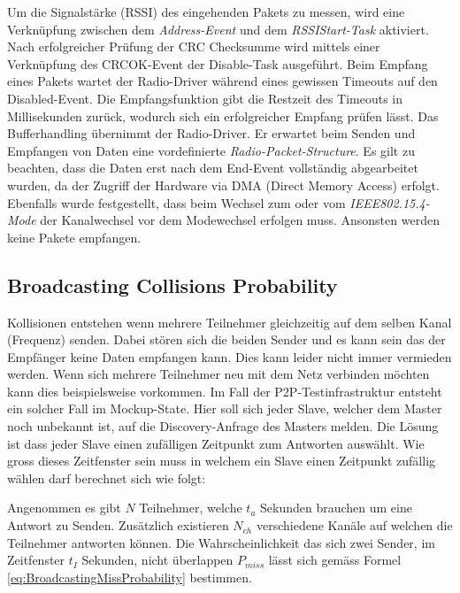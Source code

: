 Um die Signalstärke (RSSI) des eingehenden Pakets zu messen, wird eine Verknüpfung zwischen dem \textit{Address-Event} und dem \textit{RSSIStart-Task} aktiviert.
Nach erfolgreicher Prüfung der CRC Checksumme wird mittels einer Verknüpfung des CRCOK-Event der Disable-Task ausgeführt.
Beim Empfang eines Pakets wartet der Radio-Driver während eines gewissen Timeouts auf den Disabled-Event.
Die Empfangsfunktion gibt die Restzeit des Timeouts in Millisekunden zurück, wodurch sich ein erfolgreicher Empfang prüfen lässt.
Das Bufferhandling übernimmt der Radio-Driver. Er erwartet beim Senden und Empfangen von Daten eine vordefinierte \textit{Radio-Packet-Structure}.
Es gilt zu beachten, dass die Daten erst nach dem End-Event  vollständig abgearbeitet wurden, da der Zugriff der Hardware via DMA (Direct Memory Access) erfolgt.
Ebenfalls wurde festgestellt, dass beim Wechsel zum oder vom  \textit{IEEE802.15.4-Mode} der Kanalwechsel vor dem Modewechsel erfolgen muss. Ansonsten werden keine Pakete empfangen. \cite{nordic_semi_nrf_infocenter_radio_receive_sequence_2020}


\subsection{Broadcasting Collisions Probability}\label{sec:BroadcastingCollissionsProbability}

Kollisionen entstehen wenn mehrere Teilnehmer gleichzeitig auf dem selben Kanal (Frequenz) senden.
Dabei stören sich die beiden Sender und es kann sein das der Empfänger keine Daten empfangen kann.
Dies kann leider nicht immer vermieden werden. Wenn sich mehrere Teilnehmer neu mit dem Netz verbinden möchten kann dies beispielsweise vorkommen.
Im Fall der P2P-Testinfrastruktur entsteht ein solcher Fall im Mockup-State.
Hier soll sich jeder Slave, welcher dem Master noch unbekannt ist, auf die Discovery-Anfrage des Masters melden.
Die Lösung ist dass jeder Slave einen zufälligen Zeitpunkt zum Antworten auswählt.
Wie gross dieses Zeitfenster sein muss in welchem ein Slave einen Zeitpunkt zufällig wählen darf berechnet sich wie folgt:

Angenommen es gibt $N$ Teilnehmer, welche $t_a$ Sekunden brauchen um eine Antwort zu Senden.
Zusätzlich existieren $N_{ch}$ verschiedene Kanäle auf welchen die Teilnehmer antworten können.
Die Wahrscheinlichkeit das sich zwei Sender, im Zeitfenster $t_I$ Sekunden, nicht überlappen $P_{miss}$ lässt sich gemäss Formel \ref{eq:BroadcastingMissProbability} bestimmen. \cite{rk_how_to_deal_with_broadcasting_collision_2020}

